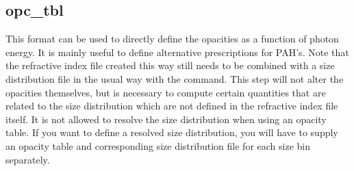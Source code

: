\subsection{opc\_tbl}

This format can be used to directly define the opacities as a function of
photon energy. It is mainly useful to define alternative prescriptions for
PAH's. Note that the refractive index file created this way still needs to be
combined with a size distribution file in the usual way with the
 command. This step will not alter the opacities
themselves, but is necessary to compute certain quantities that are related to
the size distribution which are not defined in the refractive index file
itself. It is not allowed to resolve the size distribution when using an
opacity table. If you want to define a resolved size distribution, you will
have to supply an opacity table and corresponding size distribution file for
each size bin separately.

